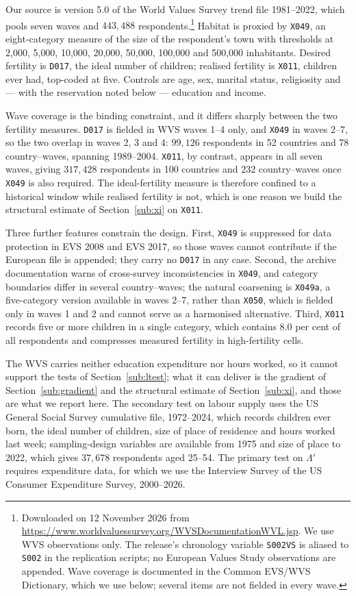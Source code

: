 \documentclass[11pt]{article}
\begin{document}
Our source is version 5.0 of the World Values Survey trend file 1981--2022, which pools seven waves and
$443{,}488$ respondents.\footnote{Downloaded on 12 November 2026 from
\url{https://www.worldvaluessurvey.org/WVSDocumentationWVL.jsp}.
We use WVS observations only. The release's chronology variable \texttt{S002VS} is
aliased to \texttt{S002} in the replication scripts; no European Values Study observations are appended.
Wave coverage is documented in the Common EVS/WVS Dictionary, which we use below; several items
are not fielded in every wave.} Habitat is proxied by \texttt{X049}, an eight-category measure of
the size of the respondent's town with thresholds at 2{,}000, 5{,}000, 10{,}000, 20{,}000,
50{,}000, 100{,}000 and 500{,}000 inhabitants. Desired fertility is \texttt{D017}, the ideal number
of children; realised fertility is \texttt{X011}, children ever had, top-coded at five. Controls
are age, sex, marital status, religiosity and --- with the reservation noted below --- education
and income.

Wave coverage is the binding constraint, and it differs sharply between the two fertility measures.
\texttt{D017} is fielded in WVS waves 1--4 only, and \texttt{X049} in waves 2--7, so the two
overlap in waves 2, 3 and 4: $99{,}126$ respondents in 52 countries and 78 country--waves, spanning
1989--2004. \texttt{X011}, by contrast, appears in all seven waves, giving $317{,}428$ respondents
in 100 countries and 232 country--waves once \texttt{X049} is also required. The ideal-fertility
measure is therefore confined to a historical window while realised fertility is not, which is one
reason we build the structural estimate of Section~\ref{sub:xi} on \texttt{X011}.

Three further features constrain the design. First, \texttt{X049} is suppressed for data protection
in EVS 2008 and EVS 2017, so those waves cannot contribute if the European file is appended; they
carry no \texttt{D017} in any case. Second, the archive documentation warns of cross-survey
inconsistencies in \texttt{X049}, and category boundaries differ in several country--waves; the
natural coarsening is \texttt{X049a}, a five-category version available in waves 2--7, rather than
\texttt{X050}, which is fielded only in waves 1 and 2 and cannot serve as a harmonised alternative.
Third, \texttt{X011} records five or more children in a single category, which contains $8.0$ per cent of all respondents and
compresses measured fertility in high-fertility cells.

The WVS carries neither education expenditure nor hours worked, so it cannot support the tests of
Section~\ref{sub:ltest}; what it can deliver is the gradient of Section~\ref{sub:gradient} and the
structural estimate of Section~\ref{sub:xi}, and those are what we report here. The secondary test
on labour supply uses the US General Social Survey cumulative file, 1972--2024, which records
children ever born, the ideal number of children, size of place of residence and hours worked last
week; sampling-design variables are available from 1975 and size of place to 2022, which gives
$37{,}678$ respondents aged 25--54. The primary test on $\Lambda'$ requires expenditure data, for which we use the Interview Survey of
the US Consumer Expenditure Survey, 2000--2026.
\end{document}
